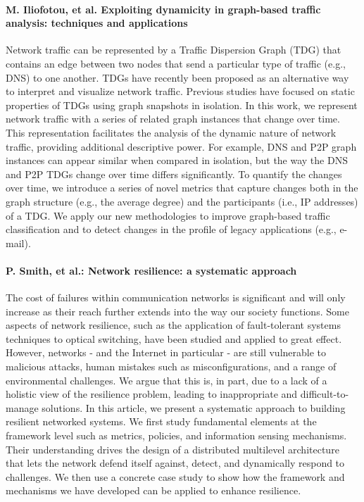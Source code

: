 \paragraph*{M. Iliofotou, et al. Exploiting dynamicity in graph-based 
traffic analysis: techniques and applications}\cite{iliofotou2009exploiting}
Network traffic can be represented by a Traffic Dispersion Graph (TDG) that contains an edge between two nodes that send a particular type of traffic (e.g., DNS) to one another. TDGs have recently been proposed as an alternative way to interpret and visualize network traffic. Previous studies have focused on static properties of TDGs using graph snapshots in isolation. In this work, we represent network traffic with a series of related graph instances that change over time. This representation facilitates the analysis of the dynamic nature of network traffic, providing additional descriptive power. For example, DNS and P2P graph instances can appear similar when compared in isolation, but the way the DNS and P2P TDGs change over time differs significantly. To quantify the changes over time, we introduce a series of novel metrics that capture changes both in the graph structure (e.g., the average degree) and the participants (i.e., IP addresses) of a TDG. We apply our new methodologies to improve graph-based traffic classification and to detect changes in the profile of legacy applications (e.g., e-mail).


\paragraph*{P. Smith, et al.: Network resilience: a systematic approach}\cite{smith2011network}
The cost of failures within communication networks is significant and will only increase as their reach further extends into the way our society functions. Some aspects of network resilience, such as the application of fault-tolerant systems techniques to optical switching, have been studied and applied to great effect. However, networks - and the Internet in particular - are still vulnerable to malicious attacks, human mistakes such as misconfigurations, and a range of environmental challenges. We argue that this is, in part, due to a lack of a holistic view of the resilience problem, leading to inappropriate and difficult-to-manage solutions. In this article, we present a systematic approach to building resilient networked systems. We first study fundamental elements at the framework level such as metrics, policies, and information sensing mechanisms. Their understanding drives the design of a distributed multilevel architecture that lets the network defend itself against, detect, and dynamically respond to challenges. We then use a concrete case study to show how the framework and mechanisms we have developed can be applied to enhance resilience.

